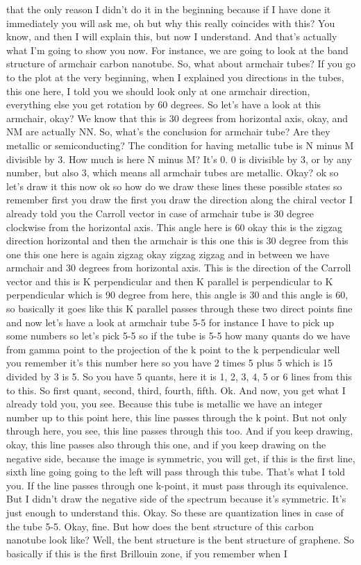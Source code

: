 that the only reason I didn't do it in the beginning because if I have done it immediately you will ask me, oh but why this really coincides with this? You know, and then I will explain this, but now I understand. And that's actually what I'm going to show you now.
For instance, we are going to look at the band structure of armchair carbon nanotube. So, what about armchair tubes? If you go to the plot at the very beginning, when I explained you directions in the tubes, this one here, I told you we should look only at one armchair direction, everything else you get rotation by 60 degrees. So let's have a look at this armchair, okay? We know that this is 30 degrees from horizontal axis, okay, and NM are actually NN. So, what's the conclusion for armchair tube? Are they metallic or semiconducting? The condition for having metallic tube is N minus M divisible by 3. How much is here N minus M? It's 0. 0 is divisible by 3, or by any number, but also 3, which means all armchair tubes are metallic. Okay? ok so let's draw it this now ok so how do we draw these lines these possible states so remember first you draw the first you draw the direction along the chiral vector I already told you the Carroll vector in case of armchair tube is 30 degree clockwise from the horizontal axis. This angle here is 60 okay this is the zigzag direction horizontal and then the armchair is this one this is 30 degree from this one this one here is again zigzag okay zigzag zigzag and in between we have armchair and 30 degrees from horizontal axis. This is the direction of the Carroll vector and this is K perpendicular and then K parallel is perpendicular to K perpendicular which is 90 degree from here, this angle is 30 and this angle is 60, so basically it goes like this K parallel passes through these two direct points fine and now let's have a look at armchair tube 5-5 for instance I have to pick up some numbers so let's pick 5-5 so if the tube is 5-5 how many quants do we have from gamma point to the projection of the k point to the k perpendicular well you remember it's this number here so you have 2 times 5 plus 5 which is 15 divided by 3 is 5. So you have 5 quants, here it is 1, 2, 3, 4, 5 or 6 lines from this to this. So first quant, second, third, fourth, fifth. Ok. And now, you get what I already told you, you see. Because this tube is metallic we have an integer number up to this point here, this line passes through the k point. But not only through here, you see, this line passes through this too. And if you keep drawing, okay, this line passes also through this one, and if you keep drawing on the negative side, because the image is symmetric, you will get, if this is the first line, sixth line going going to the left will pass through this tube. That's what I told you. If the line passes through one k-point, it must pass through its equivalence. But I didn't draw the negative side of the spectrum because it's symmetric. It's just enough to understand this. Okay. So these are quantization lines in case of the tube 5-5. Okay, fine. But how does the bent structure of this carbon nanotube look like? Well, the bent structure is the bent structure of graphene. So basically if this is the first Brillouin zone, if you remember when I 
